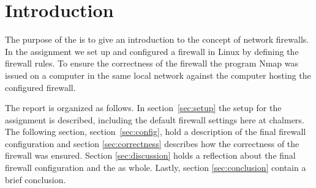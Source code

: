 \section{Introduction} 
\label{sec:intro}

The purpose of the \lab is to give an introduction to the concept of network firewalls. In the assignment we set up and configured a firewall in Linux by defining the firewall rules. To ensure the correctness of the firewall the program Nmap was issued on a computer in the same local network against the computer hosting the configured firewall. 

The report is organized as follows. In section~\ref{sec:setup} the setup for the assignment is described, including the default firewall settings here at chalmers. The following section, section~\ref{sec:config}, hold a description of the final firewall configuration and section \ref{sec:correctness} describes how the correctness of the firewall was ensured. Section \ref{sec:discussion} holds a reflection about the final firewall configuration and the \lab as whole. Lastly, section \ref{sec:conclusion} contain a brief conclusion.